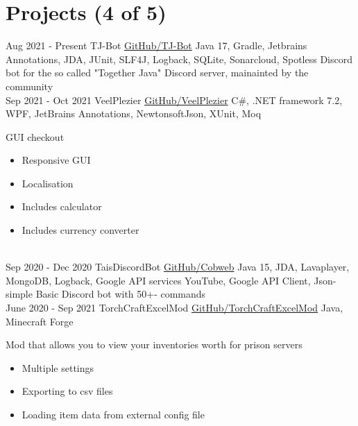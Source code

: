 \documentclass[letterpaper]{twentysecondcv} %
\begin{document}
\section{Projects (4 of 5)}
\begin{twenty} %
	\twentyitem
    		{Aug 2021 -}
		{Present}
        		{TJ-Bot}
        		{\href{https://github.com/Together-Java/TJ-Bot/}{GitHub/TJ-Bot}}
        		{Java 17, Gradle, Jetbrains Annotations, JDA, JUnit, SLF4J, Logback, SQLite, Sonarcloud, Spotless}
        		{Discord bot for the so called "Together Java" Discord server, mainainted by the community}\\
	\twentyitem
    		{Sep 2021 -}
		{Oct 2021}
        		{VeelPlezier}
        		{\href{https://github.com/Tais993/VeelPlezier}{GitHub/VeelPlezier}}
        		{C\#, .NET framework 7.2, WPF, JetBrains Annotations, NewtonsoftJson, XUnit, Moq}
        		{
        		GUI checkout
        		\begin{itemize}
        			\item Responsive GUI
        			\item Localisation
        			\item Includes calculator
        			\item Includes currency converter
        		\end{itemize}}\\
	\twentyitem
    		{Sep 2020 -}
		{Dec 2020}
        		{TaisDiscordBot}
        		{\href{https://github.com/Tais993/taisdiscordbot}{GitHub/Cobweb}}
        		{Java 15, JDA, Lavaplayer, MongoDB, Logback, Google API services YouTube, Google API Client, Json-simple}
        		{Basic Discord bot with 50+- commands}\\
	\twentyitem
    		{June 2020 -}
		{Sep 2021}
        		{TorchCraftExcelMod}
        		{\href{https://github.com/Tais993/TorchCraftExcelMod}{GitHub/TorchCraftExcelMod}}
        		{Java, Minecraft Forge}
        		{
        		Mod that allows you to view your inventories worth for prison servers
        		\begin{itemize}
        			\item Multiple settings
        			\item Exporting to csv files
        			\item Loading item data from external config file
        		\end{itemize}}\\
\end{twenty}
\end{document}
